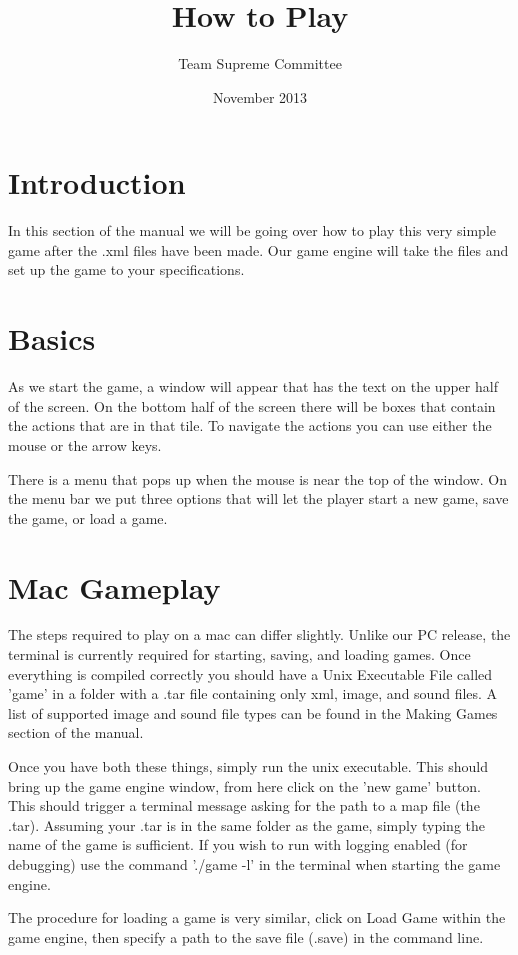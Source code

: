 \documentclass[11pt]{article}
\begin{document}
\title{How to Play}
\author{Team Supreme Committee}
\date{November 2013}
\maketitle


\section{Introduction}

In this section of the manual we will be going over how to play this very simple game after the .xml files have been made. Our game engine will take the files and set up the game to your specifications. 

\section{Basics}

As we start the game, a window will appear that has the text on the upper half of the screen. On the bottom half of the screen there will be boxes that contain the actions that are in that tile. To navigate the actions you can use either the mouse or the arrow keys.

There is a menu that pops up when the mouse is near the top of the window. On the menu bar we put three options that will let the player start a new game, save the game, or load a game.

\section{Mac Gameplay}

The steps required to play on a mac can differ slightly. Unlike our PC release, the terminal is currently required for starting, saving, and loading games. Once everything is compiled correctly you should have a Unix Executable File called 'game' in a folder with a .tar file containing only xml, image, and sound files. A list of supported image and sound file types can be found in the Making Games section of the manual. 

Once you have both these things, simply run the unix executable. This should bring up the game engine window, from here click on the 'new game' button. This should trigger a terminal message asking for the path to a map file (the .tar). Assuming your .tar is in the same folder as the game, simply typing the name of the game is sufficient. If you wish to run with logging enabled (for debugging) use the command './game -l' in the terminal when starting the game engine. 

The procedure for loading a game is very similar, click on Load Game within the game engine, then specify a path to the save file (.save) in the command line.
\end{document}
